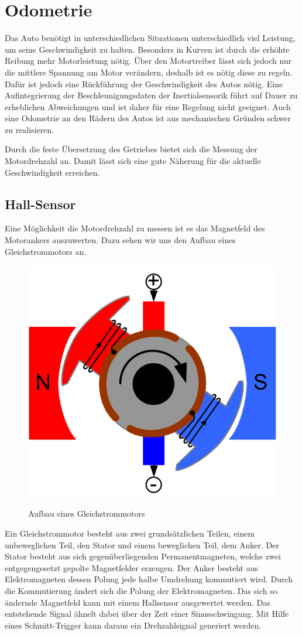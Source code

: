 \section{Odometrie}
Das Auto benötigt in unterschiedlichen Situationen unterschiedlich viel Leistung, um seine Geschwindigkeit zu halten.
Besonders in Kurven ist durch die erhöhte Reibung mehr Motorleistung nötig. Über den Motortreiber lässt sich jedoch nur
die mittlere Spannung am Motor verändern, deshalb ist es nötig diese zu regeln. Dafür ist jedoch eine Rückführung der Geschwindigkeit
des Autos nötig. Eine Aufintegrierung der Beschleunigungsdaten der Inertialsensorik führt auf Dauer zu erheblichen
Abweichungen und ist daher für eine Regelung nicht geeignet. Auch eine Odometrie an den Rädern des Autos ist
aus mechanischen Gründen schwer zu realisieren. 

Durch die feste Übersetzung des Getriebes bietet sich die Messung der Motordrehzahl an. Damit lässt sich eine gute Näherung für die aktuelle Geschwindigkeit erreichen. 

\subsection{Hall-Sensor}
Eine Möglichkeit die Motordrehzahl zu messen ist es das Magnetfeld des
Motorankers auszuwerten. Dazu sehen wir uns den Aufbau eines Gleichstrommotors an.
\begin{figure}[H]
\centering
\includegraphics[width=.5\textwidth]{motor.png}\\
\caption{Aufbau eines Gleichstrommotors \cite{gs-motor}}%
\label{fig:aufbau_motor}
\end{figure}
Ein Gleichstrommotor besteht aus zwei grundsätzlichen Teilen, einem unbeweglichen Teil, den Stator und einem beweglichen Teil, dem Anker.
Der Stator besteht aus sich gegenüberliegenden Permanentmagneten, welche zwei entgegengesetzt gepolte Magnetfelder erzeugen.
Der Anker besteht aus Elektromagneten dessen Polung jede halbe Umdrehung kommutiert wird. Durch die Kommutierung ändert sich die 
Polung der Elektromagneten. Das sich so ändernde Magnetfeld kann mit einem Hallsensor ausgewertet werden. Das entstehende 
Signal ähnelt dabei über der Zeit einer Sinusschwingung. Mit Hilfe eines Schmitt-Trigger kann daraus ein Drehzahlsignal generiert werden.

